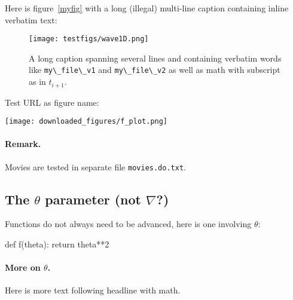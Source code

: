 \documentclass[%
oneside,                 %
final,                   %
10pt]{article}
\theoremstyle{definition}
\begin{document}
\begin{enumerate}
\vspace{6mm}



Here is figure~\vref{myfig} with a long (illegal) multi-line caption
containing inline verbatim text:

\begin{SCfigure}
  \centering
  \texttt{[image: testfigs/wave1D.png]}
  \caption{
  A long caption spanning several lines and containing verbatim words like \protect \Verb!my\_file\_v1! and \protect \Verb!my\_file\_v2! as well as math with subscript as in $t_{i+1}$. \label{myfig}
  }
\end{SCfigure}


Test URL as figure name:

\vspace{6mm}

\centerline{\texttt{[image: downloaded\_figures/f\_plot.png]}}

\vspace{6mm}


\paragraph{Remark.}
Movies are tested in separate file \texttt{movies.do.txt}.


\subsection{The $\theta$ parameter (not $\nabla$?)}
\label{decay:sec:theta}

Functions do not always need to be advanced, here is one
involving $\theta$:



\bccq
def f(theta):
    return theta**2

\eccq


\paragraph{More on $\theta$.}
Here is more text following headline with math.


\end{enumerate}
\end{document}
